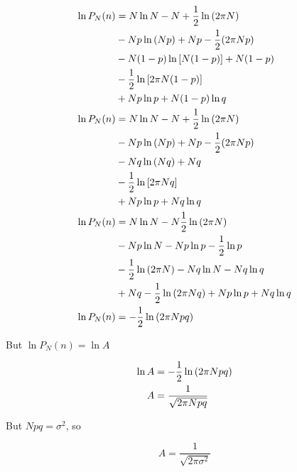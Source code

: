 \documentclass[12pt,a4paper,twocolumn]{article}
\begin{document}
\begin{align}
	\ln P_N(n) &= N \ln N - N + \frac{1}{2}\ln\qty(2\pi N) \nonumber \\
	&- Np\ln\qty(Np) + Np - \frac{1}{2}\qty(2\pi Np) \nonumber \\
	&- N(1-p)\ln\qty[N(1-p)] + N(1-p) \nonumber \\
	&- \frac{1}{2}\ln\qty[2\pi N(1-p)] \nonumber \\
	&+ Np\ln p + N(1-p)\ln q \\
	\ln P_N(n) &= N \ln N - N + \frac{1}{2}\ln\qty(2\pi N) \nonumber \\
	&- Np\ln\qty(Np) + Np - \frac{1}{2}\qty(2\pi Np) \nonumber \\
	&- Nq\ln\qty(Nq) + Nq \nonumber \\
	&- \frac{1}{2}\ln\qty[2\pi Nq] \nonumber \\
	&+ Np\ln p + Nq\ln q \\
	\ln P_N(n) &= N\ln N - N\frac{1}{2}\ln\qty(2\pi N) \nonumber \\
	&- Np\ln N - Np \ln p - \frac{1}{2}\ln p \nonumber \\
	&- \frac{1}{2}\ln\qty(2\pi N) - Nq\ln N - Nq\ln q \nonumber \\
	&+ Nq -\frac{1}{2}\ln\qty(2\pi Nq) + Np\ln p + Nq\ln q \\
	\ln P_N(n) &= -\frac{1}{2}\ln\qty(2\pi Npq)
\end{align}

But $\ln P_N(n) = \ln A$

\begin{align}
	\ln A &= -\frac{1}{2}\ln\qty(2\pi Npq) \\
	A &= \frac{1}{\sqrt{2\pi Npq}}
\end{align}

But $Npq = \sigma^2$, so

\begin{equation}
	\boxed{
		A = \frac{1}{\sqrt{2\pi\sigma^2}}
	}
\end{equation}
\end{document}
